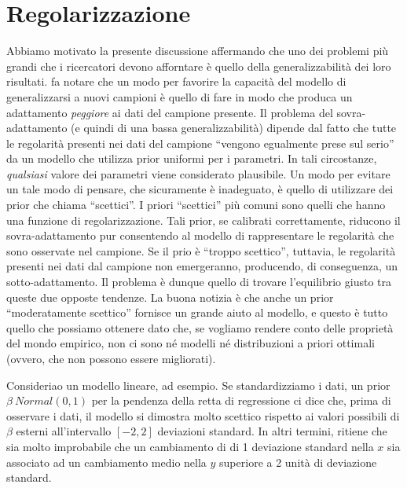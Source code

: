 \documentclass[
  11pt,
]{krantz}
\theoremstyle{definition}
\theoremstyle{definition}
\theoremstyle{definition}
\theoremstyle{definition}
\theoremstyle{remark}
\begin{document}
\hypertarget{regolarizzazione}{%
\section{Regolarizzazione}\label{regolarizzazione}}

Abbiamo motivato la presente discussione affermando che uno dei problemi più grandi che i ricercatori devono afforntare è quello della generalizzabilità dei loro risultati. \citet{McElreath_rethinking} fa notare che un modo per favorire la capacità del modello di generalizzarsi a nuovi campioni è quello di fare in modo che produca un adattamento \emph{peggiore} ai dati del campione presente. Il problema del sovra-adattamento (e quindi di una bassa generalizzabilità) dipende dal fatto che tutte le regolarità presenti nei dati del campione ``vengono egualmente prese sul serio'' da un modello che utilizza prior uniformi per i parametri. In tali circostanze, \emph{qualsiasi} valore dei parametri viene considerato plausibile. Un modo per evitare un tale modo di pensare, che sicuramente è inadeguato, è quello di utilizzare dei prior che \citet{McElreath_rethinking} chiama ``scettici''. I priori ``scettici'' più comuni sono quelli che hanno una funzione di regolarizzazione. Tali prior, se calibrati correttamente, riducono il sovra-adattamento pur consentendo al modello di rappresentare le regolarità che sono osservate nel campione. Se il prio è ``troppo scettico'', tuttavia, le regolarità presenti nei dati dal campione non emergeranno, producendo, di conseguenza, un sotto-adattamento. Il problema è dunque quello di trovare l'equilibrio giusto tra queste due opposte tendenze. La buona notizia è che anche un prior ``moderatamente scettico'' fornisce un grande aiuto al modello, e questo è tutto quello che possiamo ottenere dato che, se vogliamo rendere conto delle proprietà del mondo empirico, non ci sono né modelli né distribuzioni a priori ottimali (ovvero, che non possono essere migliorati).

Consideriao un modello lineare, ad esempio. Se standardizziamo i dati, un prior \(\beta ~ Normal(0, 1)\) per la pendenza della retta di regressione ci dice che, prima di osservare i dati, il modello si dimostra molto scettico rispetto ai valori possibili di \(\beta\) esterni all'intervallo \([-2, 2]\) deviazioni standard. In altri termini, ritiene che sia molto improbabile che un cambiamento di di 1 deviazione standard nella \(x\) sia associato ad un cambiamento medio nella \(y\) superiore a 2 unità di deviazione standard.
\end{document}
